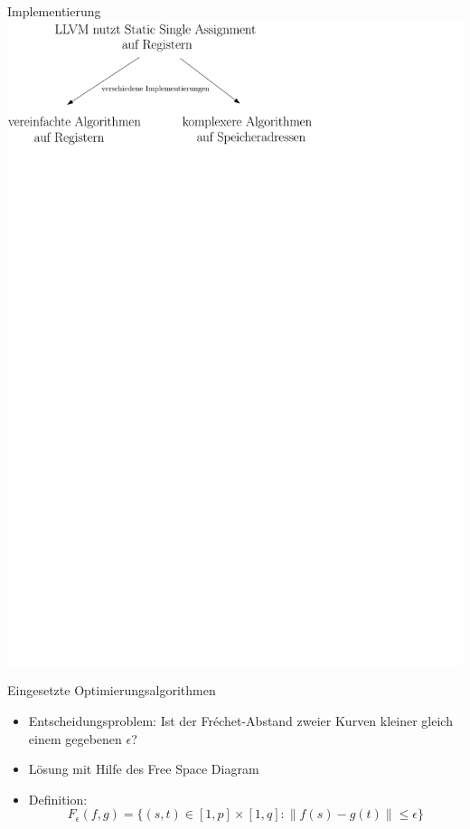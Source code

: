 \documentclass[ucs,9pt]{beamer}
\begin{document}
\begin{frame}{Implementierung}
\includegraphics[scale=0.8]{bilder/ssa}
\end{frame}

\begin{frame}{Eingesetzte Optimierungsalgorithmen}
\begin{itemize}
\item Entscheidungsproblem: Ist der Fréchet-Abstand zweier Kurven kleiner gleich einem gegebenen $\epsilon$?
\vspace{3mm}
\item Lösung mit Hilfe des Free Space Diagram
\vspace{3mm}
\item Definition: $$F_\epsilon (f,g) = \{(s,t)\in [1,p] \times [1,q] : \|f(s) - g(t)\| \leq \epsilon \}$$
\end{itemize}
\end{frame}
\end{document}
